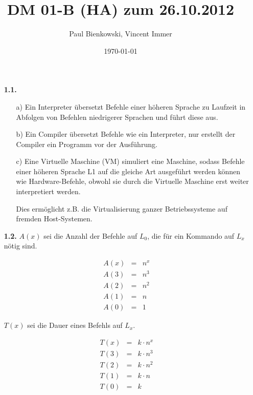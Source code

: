 \documentclass[10pt,a4paper]{article}
\author{Paul Bienkowski, Vincent Immer}
\title{DM 01-B (HA) zum 26.10.2012}
\date{\today}
\begin{document}
\setcounter{secnumdepth}{0}
\maketitle

\begin{enumerate}
    \item[\textbf{1.1.}]
        \begin{enumerate}
            \item[a)]
                Ein Interpreter übersetzt Befehle einer höheren Sprache zu Laufzeit in 
                Abfolgen von Befehlen niedrigerer Sprachen und führt diese aus.
            \item[b)]
                Ein Compiler übersetzt Befehle wie ein Interpreter, nur erstellt der 
                Compiler ein Programm vor der Ausführung.
            \item[c)]
                Eine Virtuelle Maschine (VM) simuliert eine Maschine, sodass Befehle einer
                höheren Sprache L1 auf die gleiche Art ausgeführt werden können wie Hardware-Befehle,
                obwohl sie durch die Virtuelle Maschine erst weiter interpretiert werden.
                
                Dies ermöglicht z.B. die Virtualisierung ganzer Betriebssysteme auf fremden Host-Systemen.
        \end{enumerate}
    \item[\textbf{1.2.}]
        $A(x)$ sei die Anzahl der Befehle auf $L_0$, die für ein Kommando auf $L_x$ nötig sind.
        
        $$\begin{array}{rcl}
            A(x) &=& n^x\\
            A(3) &=& n^3\\
            A(2) &=& n^2\\
            A(1) &=& n\\
            A(0) &=& 1
        \end{array}$$
        
        $T(x)$ sei die Dauer eines Befehls auf $L_x$.
    
        $$\begin{array}{rcl}
            T(x) &=& k \cdot n^x\\
            T(3) &=& k \cdot n^3\\
            T(2) &=& k \cdot n^2\\
            T(1) &=& k \cdot n\\
            T(0) &=& k
        \end{array}$$
    

\end{enumerate}
\end{document}
